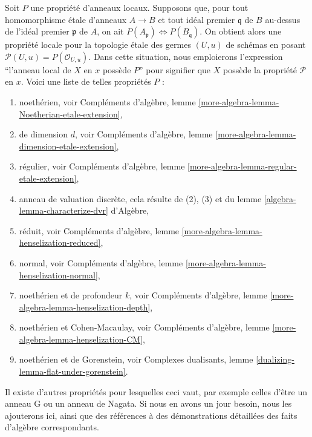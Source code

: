 \begin{remark}
\label{remark-list-properties-local-ring-local-etale-topology}
Soit $P$ une propriété d'anneaux locaux. Supposons que, pour tout
homomorphisme \'etale d'anneaux $A \to B$ et tout idéal premier $\mathfrak q$ de $B$ au-dessus de
l'idéal premier $\mathfrak p$ de $A$, on ait
$P(A_\mathfrak p) \Leftrightarrow P(B_\mathfrak q)$.
On obtient alors une propriété locale pour la topologie \'etale des germes $(U, u)$ de schémas
en posant $\mathcal{P}(U, u) = P(\mathcal{O}_{U, u})$.
Dans cette situation, nous emploierons l'expression
``l'anneau local de $X$ en $x$ possède $P$'' pour signifier que
$X$ possède la propriété $\mathcal{P}$ en $x$.
Voici une liste de telles propriétés $P$ :
\begin{enumerate}
\item noethérien, voir
Compléments d'algèbre, lemme \ref{more-algebra-lemma-Noetherian-etale-extension},
\item de dimension $d$, voir
Compléments d'algèbre, lemme \ref{more-algebra-lemma-dimension-etale-extension},
\item régulier, voir
Compléments d'algèbre, lemme \ref{more-algebra-lemma-regular-etale-extension},
\item anneau de valuation discrète, cela résulte de (2), (3) et du
lemme \ref{algebra-lemma-characterize-dvr} d'Algèbre,
\item réduit, voir
Compléments d'algèbre, lemme \ref{more-algebra-lemma-henselization-reduced},
\item normal, voir
Compléments d'algèbre, lemme \ref{more-algebra-lemma-henselization-normal},
\item noethérien et de profondeur $k$, voir
Compléments d'algèbre, lemme \ref{more-algebra-lemma-henselization-depth},
\item noethérien et Cohen-Macaulay, voir
Compléments d'algèbre, lemme \ref{more-algebra-lemma-henselization-CM},
\item noethérien et de Gorenstein, voir
Complexes dualisants, lemme \ref{dualizing-lemma-flat-under-gorenstein}.
\end{enumerate}
Il existe d'autres propriétés pour lesquelles ceci vaut, par exemple celles d'être un anneau G ou un
anneau de Nagata. Si nous en avons un jour besoin, nous les ajouterons ici,
ainsi que des références à des démonstrations détaillées des faits
d'algèbre correspondants.
\end{remark}







